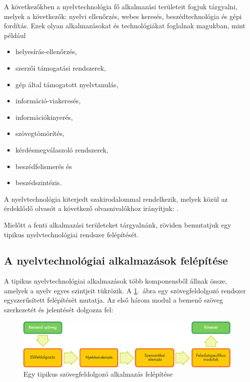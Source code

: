 \begin{multicols}{2}
  A következőkben a nyelvtechnológia fő alkalmazási területeit fogjuk tárgyalni, melyek a következők: nyelvi ellenőrzés, webes keresés, beszédtechnológia és gépi fordítás. Ezek olyan alkalmazásokat és technológiákat foglalnak magukban, mint például

  \begin{itemize}
        \item helyesírás-ellenőrzés,
        \item szerzői támogatási rendszerek,
        \item gép által támogatott nyelvtanulás,
        \item információ-viakeresés, 
        \item információkinyerés,
        \item szövegtömörítés,
        \item kérdésmegválaszoló rendszerek,
        \item beszédfelismerés és
        \item beszédszintézis.
      \end{itemize}

  A nyelvtechnológia kiterjedt szakirodalommal rendelkezik, melyek közül az érdeklődő olvasót a következő olvasnivalókhoz irányítjuk: \cite{jurafsky-martin01} \cite{manning-schuetze1} \cite{lt-world1} \cite{lt-survey1}.

  Mielőtt a fenti alkalmazási területeket tárgyalnánk, röviden bemutatjuk egy tipikus nyelvtechnológiai rendszer felépítését. 

  \subsection{A nyelvtechnológiai alkalmazások felépítése}

  A tipikus nyelvtechnológiai alkalmazások több komponensből állnak össze, amelyek a nyelv egyes szintjeit tükrözik. A \ref{fig:textprocessingarch_de}.~ábra egy szövegfeldolgozó rendszer egyszerűsített felépítését mutatja. Az első három modul a bemenő szöveg szerkezetét és jelentését dolgozza fel:

  \begin{figure}[htb]
    \center
    \includegraphics[width=\textwidth]{../_media/hungarian/text_processing_app_architecture}
    \caption{Egy tipikus szövegfeldolgozó alkalmazás felépítése}
    \label{fig:textprocessingarch_de}
  \end{figure}


\end{multicols}
